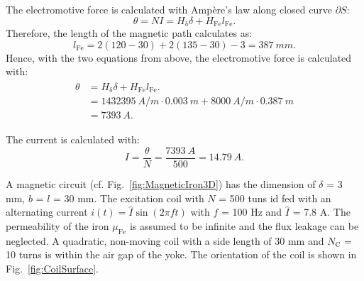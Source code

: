 \begin{solutionblock}

    The electromotive force is calculated with Ampère's law along closed curve $\partial S$:
    \begin{equation}
        \theta = N I
        = H_{\updelta} \delta + H_{\mathrm{Fe}} l_{\mathrm{Fe}}.
    \end{equation}
    Therefore, the length of the magnetic path calculates as:
    \begin{equation}
        l_{\mathrm{Fe}} = 2(120-30) + 2(135-30)-3 = 387 \ \si{mm}.
    \end{equation}
    Hence, with the two equations from above, the electromotive force is calculated with:
    \begin{align}
        \begin{split}
            \theta &= H_{\updelta} \delta + H_{\mathrm{Fe}} l_{\mathrm{Fe}}.\\
            &= 1432395 \ \si{A/m} \cdot 0.003 \ \si{m} + 8000 \ \si{A/m} \cdot 0.387 \ \si{m} \\
            &= 7393 \ \si{A}.
        \end{split}
    \end{align}

\end{solutionblock}




\begin{solutionblock}
    The current is calculated with:
    \begin{equation}
        I = \frac{\theta}{N} = \frac{7393 \ \si{A}}{500} = 14.79 \ \si{A}.
    \end{equation}

\end{solutionblock}








A magnetic circuit (cf. Fig.~\ref{fig:MagneticIron3D}) has the dimension of $\delta$ = 3 mm, $b$ = $l$ = 30 mm. The excitation coil with $N$ = 500 tuns id fed with an alternating current $i(t) = \hat{I} \sin(2\pi f t)$ with $f$ = 100 Hz and $\hat{I}$ = 7.8 A.
The permeability of the iron $\mu_{\mathrm{Fe}}$ is assumed to be infinite and the flux leakage can be neglected.
A quadratic, non-moving coil with a side length of 30 mm and $N_{\mathrm{C}}$ = 10 turns is within the air gap of the yoke. The orientation of the coil is shown in Fig.~\ref{fig:CoilSurface}. 

